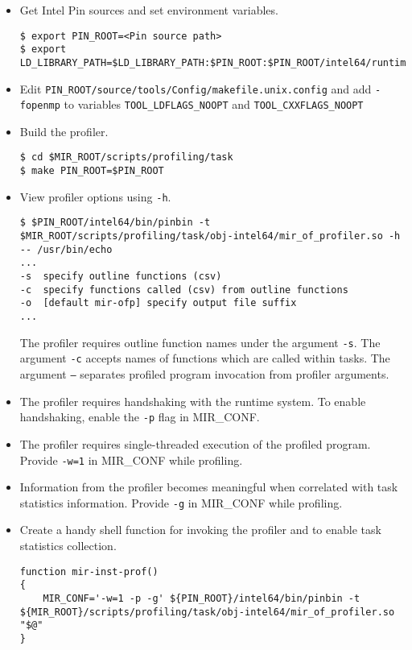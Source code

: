\documentclass[11pt,a4paper]{article}
\begin{document}
\begin{itemize}
\item Get Intel Pin sources and set environment variables.

\begin{lstlisting}[style=MyInputStyle]
$ export PIN_ROOT=<Pin source path>
$ export LD_LIBRARY_PATH=$LD_LIBRARY_PATH:$PIN_ROOT:$PIN_ROOT/intel64/runtime
\end{lstlisting}

\item Edit \texttt{PIN\_ROOT/source/tools/Config/makefile.unix.config} and add \texttt{-fopenmp} to variables \texttt{TOOL\_LDFLAGS\_NOOPT}  and \texttt{TOOL\_CXXFLAGS\_NOOPT}

\item Build the profiler.

\begin{lstlisting}[style=MyInputStyle]
$ cd $MIR_ROOT/scripts/profiling/task
$ make PIN_ROOT=$PIN_ROOT
\end{lstlisting}

\item View profiler options using \texttt{-h}.

\begin{lstlisting}[style=MyInputStyle]
$ $PIN_ROOT/intel64/bin/pinbin -t $MIR_ROOT/scripts/profiling/task/obj-intel64/mir_of_profiler.so -h -- /usr/bin/echo
...
-s  specify outline functions (csv)
-c  specify functions called (csv) from outline functions
-o  [default mir-ofp] specify output file suffix
...
\end{lstlisting}

The profiler requires outline function names under the argument \texttt{-s}. The argument \texttt{-c} accepts names of functions which are called within tasks. The argument \texttt{--} separates profiled program invocation from profiler arguments.

\item The profiler requires handshaking with the runtime system. To enable handshaking, enable the \texttt{-p} flag in MIR\_CONF.

\item The profiler requires single-threaded execution of the profiled program. Provide \texttt{-w=1} in MIR\_CONF while profiling.

\item Information from the profiler becomes meaningful when correlated with task statistics information. Provide \texttt{-g} in MIR\_CONF while profiling.

\item Create a handy shell function for invoking the profiler and to enable task statistics collection.

\begin{lstlisting}[style=MyInputStyle]
function mir-inst-prof()
{
    MIR_CONF='-w=1 -p -g' ${PIN_ROOT}/intel64/bin/pinbin -t ${MIR_ROOT}/scripts/profiling/task/obj-intel64/mir_of_profiler.so "$@"
}
\end{lstlisting}
\end{itemize}
\end{document}
